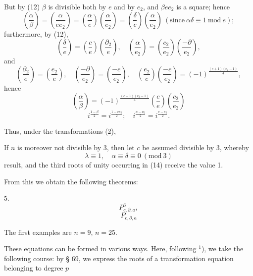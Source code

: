 But by (12) $\beta$ is divisible both by $e$ and by $e_2$, and
$\beta e e_2$ is a square; hence
\[
\left(\frac{\alpha}{\beta}\right) = \left(\frac{\alpha}{ee_2}\right) = \left(\frac{\alpha}{e}\right)\left(\frac{\alpha}{e_2}\right) = \left(\frac{\delta}{e}\right)\left(\frac{\alpha}{e_2}\right) \ (\text{since}\ \alpha\delta \equiv 1\ \mathrm{mod}\ e);
\]
furthermore, by (12),
\[
\left(\frac{\delta}{e}\right) = \left(\frac{c}{e}\right)\left(\frac{\partial_2}{e}\right), \quad \left(\frac{\alpha}{e_2}\right) = \left(\frac{c_2}{e_2}\right)\left(\frac{-\partial}{e_2}\right),
\]
and
\[
\left(\frac{\partial_2}{e}\right) = \left(\frac{e_2}{e}\right), \quad \left(\frac{-\partial}{e_2}\right) = \left(\frac{-e}{e_2}\right), \quad \left(\frac{e_2}{e}\right)\left(\frac{-e}{e_2}\right) = (-1)^{\frac{(e+1)(e_2-1)}{4}},
\]
hence
\[
\left(\frac{\alpha}{\beta}\right) = (-1)^{\frac{(e+1)(e_2-1)}{4}}\left(\frac{c}{e}\right)\left(\frac{c_2}{e_2}\right)
\]
\[
i^{\frac{1-\beta}{2}} = i^{\frac{1-ee_2}{2}}; \quad i^{\frac{a-a_2}{2}} = i^{\frac{e-e_2}{2}}.
\]

Thus, under the transformations (2),

If $n$ is moreover not divisible by 3, then let $c$ be assumed
divisible by 3, whereby
\[
\lambda \equiv 1, \quad \alpha \equiv \delta \equiv 0\ (\mathrm{mod}\ 3)
\]
result, and the third roots of unity occurring in (14) receive the
value 1.

From this we obtain the following theorems:

5. 
\[
P^3_{c,\partial,a},
\]
\[
P_{c,\partial,a}
\]

The first examples are $n=9$, $n=25$.

These equations can be formed in various ways. Here, following
$^1$), we take the following course: by § 69, we express
the roots of a transformation equation belonging to degree $p$

\begingroup
\renewcommand{\thefootnote}{1)}
\endgroup

